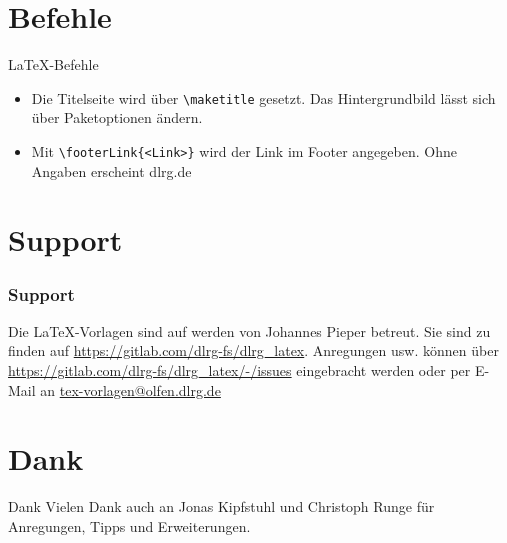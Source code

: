 \documentclass[]{beamer}
\begin{document}
\section{Befehle}
\begin{frame}[fragile]{\LaTeX-Befehle}
    \begin{itemize}
        \item Die Titelseite wird über \lstinline$\maketitle$ gesetzt. Das Hintergrundbild lässt sich über Paketoptionen ändern.
        \item Mit \lstinline|\footerLink{<Link>}| wird der Link im Footer angegeben. Ohne Angaben erscheint dlrg.de
    \end{itemize}
\end{frame}

\section{Support}
\begin{frame}
    \frametitle{Support}
    Die \LaTeX-Vorlagen sind auf werden von Johannes Pieper betreut. Sie sind zu finden auf \url{https://gitlab.com/dlrg-fs/dlrg_latex}. Anregungen usw. können über \url{https://gitlab.com/dlrg-fs/dlrg_latex/-/issues} eingebracht werden oder per E-Mail an \href{mailto:tex-vorlagen@olfen.dlrg.de}{tex-vorlagen@olfen.dlrg.de}
\end{frame}

\section{Dank}
\begin{frame}{Dank}
    Vielen Dank auch an Jonas Kipfstuhl und Christoph Runge für Anregungen, Tipps und Erweiterungen.
\end{frame}
\end{document}
